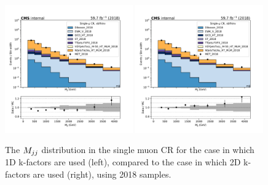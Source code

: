 \begin{figure}
    \begin{center}
        \includegraphics[width=0.49\textwidth]{fig/datamc/cr_1m_vbf/cr_1m_vbf_mjj_losf_2018.pdf}
        \includegraphics[width=0.49\textwidth]{fig/datamc_2dkfac/cr_1m_vbf/cr_1m_vbf_mjj_losf_2018.pdf} 
        \caption{The $M_{jj}$ distribution in the single muon CR for the case in which 1D k-factors are used (left), 
        compared to the case in which 2D k-factors are used (right), using 2018 samples.}
        \label{fig:mjj_2018}
    \end{center}
\end{figure}

